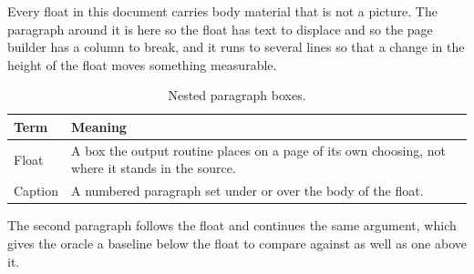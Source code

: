 \documentclass{article}
\begin{document}
Every float in this document carries body material that is not a
picture. The paragraph around it is here so the float has text to displace and
so the page builder has a column to break, and it runs to several lines so that
a change in the height of the float moves something measurable.

\begin{table}[h]
\centering
\begin{tabular}{|l|p{5cm}|}
\hline
Term & Meaning \\
\hline
Float & A box the output routine places on a page of its own choosing, not
where it stands in the source. \\
Caption & A numbered paragraph set under or over the body of the float. \\
\hline
\end{tabular}
\caption{Nested paragraph boxes.}
\end{table}

The second paragraph follows the float and continues the same
argument, which gives the oracle a baseline below the float to compare against
as well as one above it.
\end{document}
